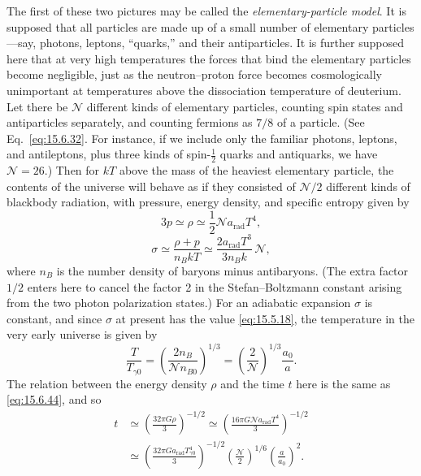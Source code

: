 The first of these two pictures may be called the \emph{elementary-particle
model}. It is supposed that all particles are made up of a small number of
elementary particles---say, photons, leptons, ``quarks,'' and their
antiparticles. It is further supposed here that at very high temperatures the
forces that bind the elementary particles become negligible, just as the
neutron--proton force becomes cosmologically unimportant at temperatures above
the dissociation temperature of deuterium. Let there be \(\mathcal N\)
different kinds of elementary particles, counting spin states and antiparticles
separately, and counting fermions as \(7/8\) of a particle. (See
Eq.~\eqref{eq:15.6.32}. For instance, if we include only the familiar photons,
leptons, and antileptons, plus three kinds of spin-\(\tfrac12\) quarks and
antiquarks, we have \(\mathcal N=26\).) Then for \(kT\) above the mass of
the heaviest elementary particle, the contents of the universe will behave as
if they consisted of \(\mathcal N/2\) different kinds of blackbody radiation,
with pressure, energy density, and specific entropy given by
\begin{equation}
  3p\simeq\rho\simeq\frac12\mathcal N a_{\mathrm{rad}}T^4,
  \tag{15.11.1}\label{eq:15.11.1}
\end{equation}
\begin{equation}
  \sigma
  \simeq
  \frac{\rho+p}{n_BkT}
  \simeq
  \frac{2a_{\mathrm{rad}}T^3}{3n_Bk}\,\mathcal N,
  \tag{15.11.2}\label{eq:15.11.2}
\end{equation}
where \(n_B\) is the number density of baryons minus antibaryons. (The extra
factor \(1/2\) enters here to cancel the factor 2 in the
Stefan--Boltzmann constant arising from the two photon polarization states.)
For an adiabatic expansion \(\sigma\) is constant, and since \(\sigma\) at
present has the value \eqref{eq:15.5.18}, the temperature in the very early
universe is given by
\begin{equation}
  \frac{T}{T_{\gamma0}}
  =
  \left(\frac{2n_B}{\mathcal N n_{B0}}\right)^{1/3}
  =
  \left(\frac2{\mathcal N}\right)^{1/3}
  \frac{a_0}{a}.
  \tag{15.11.3}\label{eq:15.11.3}
\end{equation}
The relation between the energy density \(\rho\) and the time \(t\) here is
the same as \eqref{eq:15.6.44}, and so
\begin{equation}
  \begin{split}
  t
  &\simeq
  \left(\frac{32\pi G\rho}{3}\right)^{-1/2}
  \simeq
  \left(
    \frac{16\pi G\mathcal N a_{\mathrm{rad}}T^4}{3}
  \right)^{-1/2}\\
  &\simeq
  \left(
    \frac{32\pi G a_{\mathrm{rad}}T_{\gamma0}^4}{3}
  \right)^{-1/2}
  \left(\frac{\mathcal N}{2}\right)^{1/6}
  \left(\frac a{a_0}\right)^2.
  \end{split}
  \tag{15.11.4}\label{eq:15.11.4}
\end{equation}

